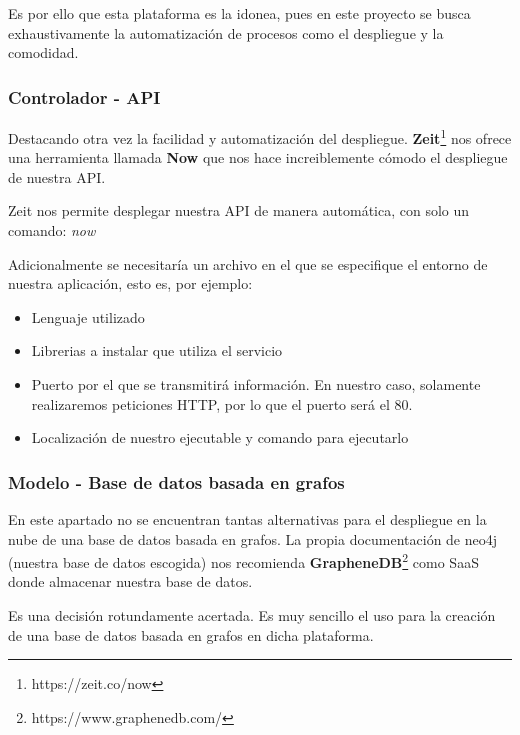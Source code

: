 Es por ello que esta plataforma es la idonea, pues en este proyecto se busca exhaustivamente la automatización de procesos como el despliegue y la comodidad.

\subsubsection{Controlador - API}

Destacando otra vez la facilidad y automatización del despliegue. \textbf{Zeit}\footnote{https://zeit.co/now} nos ofrece una herramienta llamada \textbf{Now} que nos hace increiblemente cómodo el despliegue de nuestra API.

Zeit nos permite desplegar nuestra API de manera automática, con solo un comando: \textit{now}

Adicionalmente se necesitaría un archivo en el que se especifique el entorno de nuestra aplicación, esto es, por ejemplo:

\begin{itemize}
    \item Lenguaje utilizado
    \item Librerias a instalar que utiliza el servicio
    \item Puerto por el que se transmitirá información. En nuestro caso, solamente realizaremos peticiones HTTP, por lo que el puerto será el 80.
    \item Localización de nuestro ejecutable y comando para ejecutarlo
\end{itemize}

\subsubsection{Modelo - Base de datos basada en grafos}

En este apartado no se encuentran tantas alternativas para el despliegue en la nube de una base de datos basada en grafos. La propia documentación de neo4j (nuestra base de datos escogida) nos recomienda \textbf{GrapheneDB}\footnote{https://www.graphenedb.com/} como SaaS donde almacenar nuestra base de datos.

Es una decisión rotundamente acertada. Es muy sencillo el uso para la creación de una base de datos basada en grafos en dicha plataforma.